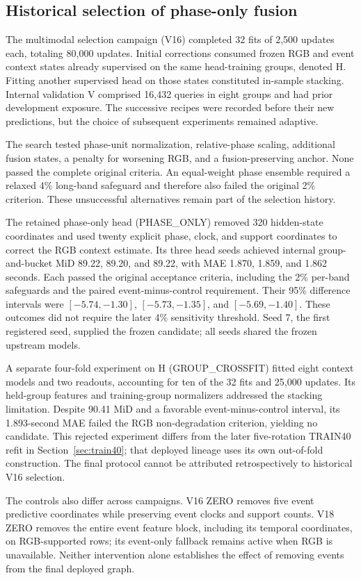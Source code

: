 \subsection{Historical selection of phase-only fusion}
\label{sec:v16-selection}

The multimodal selection campaign (V16) completed 32 fits of 2,500 updates each, totaling 80,000 updates. Initial corrections consumed frozen RGB and event context states already supervised on the same head-training groups, denoted H. Fitting another supervised head on those states constituted in-sample stacking. Internal validation V comprised 16,432 queries in eight groups and had prior development exposure. The successive recipes were recorded before their new predictions, but the choice of subsequent experiments remained adaptive. 

The search tested phase-unit normalization, relative-phase scaling, additional fusion states, a penalty for worsening RGB, and a fusion-preserving anchor. None passed the complete original criteria. An equal-weight phase ensemble required a relaxed 4\% long-band safeguard and therefore also failed the original 2\% criterion. These unsuccessful alternatives remain part of the selection history. 

The retained phase-only head (PHASE\_ONLY) removed 320 hidden-state coordinates and used twenty explicit phase, clock, and support coordinates to correct the RGB context estimate. Its three head seeds achieved internal group-and-bucket MiD 89.22, 89.20, and 89.22, with MAE 1.870, 1.859, and 1.862 seconds. Each passed the original acceptance criteria, including the 2\% per-band safeguards and the paired event-minus-control requirement. Their 95\% difference intervals were $[-5.74,-1.30]$, $[-5.73,-1.35]$, and $[-5.69,-1.40]$. These outcomes did not require the later 4\% sensitivity threshold. Seed 7, the first registered seed, supplied the frozen candidate; all seeds shared the frozen upstream models. 

A separate four-fold experiment on H (GROUP\_CROSSFIT) fitted eight context models and two readouts, accounting for ten of the 32 fits and 25,000 updates. Its held-group features and training-group normalizers addressed the stacking limitation. Despite 90.41 MiD and a favorable event-minus-control interval, its 1.893-second MAE failed the RGB non-degradation criterion, yielding no candidate. This rejected experiment differs from the later five-rotation TRAIN40 refit in Section~\ref{sec:train40}; that deployed lineage uses its own out-of-fold construction. The final protocol cannot be attributed retrospectively to historical V16 selection. 

The controls also differ across campaigns. V16 ZERO removes five event predictive coordinates while preserving event clocks and support counts. V18 ZERO removes the entire event feature block, including its temporal coordinates, on RGB-supported rows; its event-only fallback remains active when RGB is unavailable. Neither intervention alone establishes the effect of removing events from the final deployed graph. 
